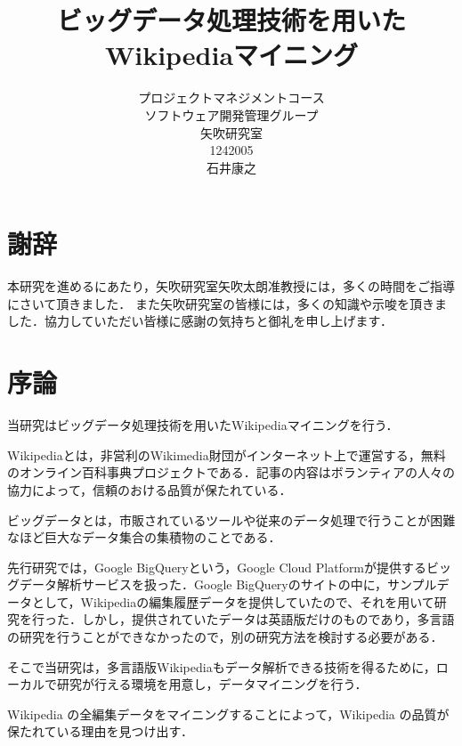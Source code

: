

\usepackage{here}

\title{ビッグデータ処理技術を用いたWikipediaマイニング}
\author{プロジェクトマネジメントコース\\
ソフトウェア開発管理グループ\\
矢吹研究室\\
1242005\\
石井康之}
\date{}

\maketitle

\chapter*{謝辞}

本研究を進めるにあたり，矢吹研究室矢吹太朗准教授には，多くの時間をご指導にさいて頂きました．
また矢吹研究室の皆様には，多くの知識や示唆を頂きました．協力していただい皆様に感謝の気持ちと御礼を申し上げます．

\tableofcontents%

\chapter{序論}

当研究はビッグデータ処理技術を用いたWikipediaマイニングを行う．

Wikipediaとは，非営利のWikimedia財団がインターネット上で運営する，無料のオンライン百科事典プロジェクトである．記事の内容はボランティアの人々の協力によって，信頼のおける品質が保たれている．

ビッグデータとは，市販されているツールや従来のデータ処理で行うことが困難なほど巨大なデータ集合の集積物のことである．

先行研究では，{Google BigQuery}という，{Google Cloud Platform}が提供するビッグデータ解析サービスを扱った．{Google BigQuery}のサイトの中に，サンプルデータとして，Wikipediaの編集履歴データを提供していたので、それを用いて研究を行った．しかし，提供されていたデータは英語版だけのものであり，多言語の研究を行うことができなかったので，別の研究方法を検討する必要がある．

そこで当研究は，多言語版Wikipediaもデータ解析できる技術を得るために，ローカルで研究が行える環境を用意し，データマイニングを行う．

Wikipedia の全編集データをマイニングすることによって，Wikipedia の品質が保たれている理由を見つけ出す．



